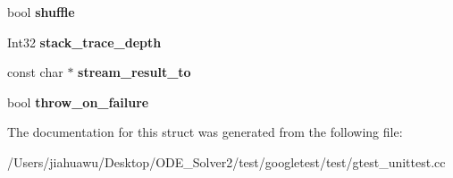 \begin{DoxyCompactItemize}
\mbox{\label{structtesting_1_1_flags_a51c689e47e0f55c16116ac2a1d3b05d6}} 
bool {\bfseries shuffle}
\item 
\mbox{\label{structtesting_1_1_flags_a20c6592453909c1adace64bf6a2bc2de}} 
Int32 {\bfseries stack\+\_\+trace\+\_\+depth}
\item 
\mbox{\label{structtesting_1_1_flags_ab09849fd3e095d5628dec65ec4dce9e1}} 
const char $\ast$ {\bfseries stream\+\_\+result\+\_\+to}
\item 
\mbox{\label{structtesting_1_1_flags_ab8e7d21e31e641efe47b8050759e001a}} 
bool {\bfseries throw\+\_\+on\+\_\+failure}
\end{DoxyCompactItemize}


The documentation for this struct was generated from the following file\+:\begin{DoxyCompactItemize}
\item 
/\+Users/jiahuawu/\+Desktop/\+O\+D\+E\+\_\+\+Solver2/test/googletest/test/gtest\+\_\+unittest.\+cc\end{DoxyCompactItemize}
